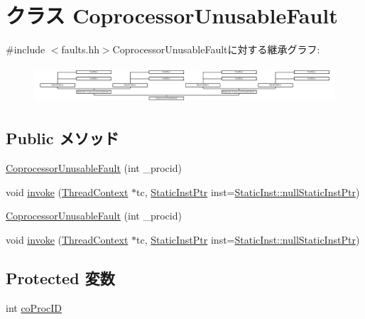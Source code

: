 \hypertarget{classMipsISA_1_1CoprocessorUnusableFault}{
\section{クラス CoprocessorUnusableFault}
\label{classMipsISA_1_1CoprocessorUnusableFault}
}


{\ttfamily \#include $<$faults.hh$>$}CoprocessorUnusableFaultに対する継承グラフ:\begin{figure}[H]
\begin{center}
\leavevmode
\includegraphics[height=1.38889cm]{classMipsISA_1_1CoprocessorUnusableFault}
\end{center}
\end{figure}
\subsection*{Public メソッド}
\begin{DoxyCompactItemize}
\item 
\hyperlink{classMipsISA_1_1CoprocessorUnusableFault_a54e55aef7779800eaf4b25f8f6fc571a}{CoprocessorUnusableFault} (int \_\-procid)
\item 
void \hyperlink{classMipsISA_1_1CoprocessorUnusableFault_a2bd783b42262278d41157d428e1f8d6f}{invoke} (\hyperlink{classThreadContext}{ThreadContext} $\ast$tc, \hyperlink{classRefCountingPtr}{StaticInstPtr} inst=\hyperlink{classStaticInst_aa793d9793af735f09096369fb17567b6}{StaticInst::nullStaticInstPtr})
\item 
\hyperlink{classMipsISA_1_1CoprocessorUnusableFault_a54e55aef7779800eaf4b25f8f6fc571a}{CoprocessorUnusableFault} (int \_\-procid)
\item 
void \hyperlink{classMipsISA_1_1CoprocessorUnusableFault_a2bd783b42262278d41157d428e1f8d6f}{invoke} (\hyperlink{classThreadContext}{ThreadContext} $\ast$tc, \hyperlink{classRefCountingPtr}{StaticInstPtr} inst=\hyperlink{classStaticInst_aa793d9793af735f09096369fb17567b6}{StaticInst::nullStaticInstPtr})
\end{DoxyCompactItemize}
\subsection*{Protected 変数}
\begin{DoxyCompactItemize}
\item 
int \hyperlink{classMipsISA_1_1CoprocessorUnusableFault_a29d755205150fee078e98a57e96d2ca1}{coProcID}
\end{DoxyCompactItemize}


